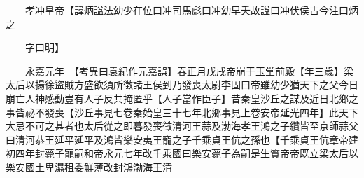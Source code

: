 　　孝冲皇帝【諱炳諡法幼少在位曰冲司馬彪曰冲幼早夭故諡曰冲伏侯古今注曰炳之

　　字曰明】

　　永嘉元年　【考異曰袁紀作元嘉誤】春正月戊戌帝崩于玉堂前殿【年三歲】梁太后以揚徐盜賊方盛欲須所徵諸王侯到乃發喪太尉李固曰帝雖幼少猶天下之父今日崩亡人神感動豈有人子反共掩匿乎【人子當作臣子】昔秦皇沙丘之謀及近日北鄉之事皆祕不發喪【沙丘事見七卷秦始皇三十七年北鄉事見上卷安帝延光四年】此天下大忌不可之甚者也太后從之即暮發喪徵清河王蒜及渤海孝王鴻之子纘皆至京師蒜父曰清河恭王延平延平及鴻皆樂安夷王寵之子千乘貞王伉之孫也【千乘貞王伉章帝建初四年封薨子寵嗣和帝永元七年改千乘國曰樂安薨子為嗣是生質帝帝既立梁太后以樂安國土卑濕租委鮮薄改封鴻渤海王清